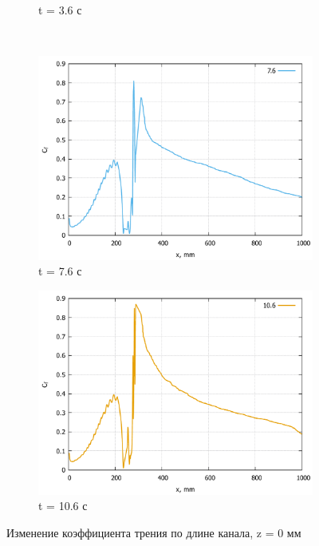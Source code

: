 \begin{figure}[H]
\begin{subfigure}{.5\textwidth}
			\caption{t = 3.6 с}
			\label{fig:Cf-T360}
		\end{subfigure}
		\\
		\begin{subfigure}{.5\textwidth}
			\centering
			\includegraphics[width=1\linewidth]{../Assets/Cf-T760}
			\caption{t = 7.6 с}
			\label{fig:Cf-T760}
		\end{subfigure}%
		\begin{subfigure}{.5\textwidth}
			\centering
			\includegraphics[width=1\linewidth]{../Assets/Cf-T1060}
			\caption{t = 10.6 с}
			\label{fig:Cf-T1060}
		\end{subfigure}
		\caption{Изменение коэффициента трения по длине канала, z = 0 мм}
		\label{fig:cf}
	\end{figure}
